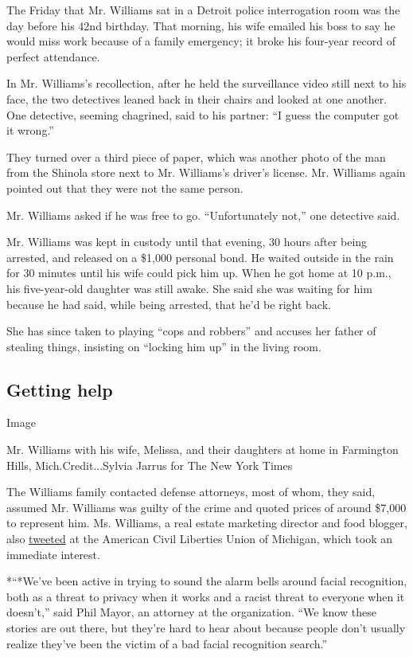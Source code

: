 The Friday that Mr. Williams sat in a Detroit police interrogation room
was the day before his 42nd birthday. That morning, his wife emailed his
boss to say he would miss work because of a family emergency; it broke
his four-year record of perfect attendance.

In Mr. Williams's recollection, after he held the surveillance video
still next to his face, the two detectives leaned back in their chairs
and looked at one another. One detective, seeming chagrined, said to his
partner: ``I guess the computer got it wrong.''

They turned over a third piece of paper, which was another photo of the
man from the Shinola store next to Mr. Williams's driver's license. Mr.
Williams again pointed out that they were not the same person.

Mr. Williams asked if he was free to go. ``Unfortunately not,'' one
detective said.

Mr. Williams was kept in custody until that evening, 30 hours after
being arrested, and released on a \$1,000 personal bond. He waited
outside in the rain for 30 minutes until his wife could pick him up.
When he got home at 10 p.m., his five-year-old daughter was still awake.
She said she was waiting for him because he had said, while being
arrested, that he'd be right back.

She has since taken to playing ``cops and robbers'' and accuses her
father of stealing things, insisting on ``locking him up'' in the living
room.

\hypertarget{getting-help}{%
\subsection{Getting help}\label{getting-help}}

Image

Mr. Williams with his wife, Melissa, and their daughters at home in
Farmington Hills, Mich.Credit...Sylvia Jarrus for The New York Times

The Williams family contacted defense attorneys, most of whom, they
said, assumed Mr. Williams was guilty of the crime and quoted prices of
around \$7,000 to represent him. Ms. Williams, a real estate marketing
director and food blogger, also
\href{https://twitter.com/PPlates/status/1216813325310484481}{tweeted}
at the American Civil Liberties Union of Michigan, which took an
immediate interest.

*``*We've been active in trying to sound the alarm bells around facial
recognition, both as a threat to privacy when it works and a racist
threat to everyone when it doesn't,'' said Phil Mayor, an attorney at
the organization. ``We know these stories are out there, but they're
hard to hear about because people don't usually realize they've been the
victim of a bad facial recognition search.''

